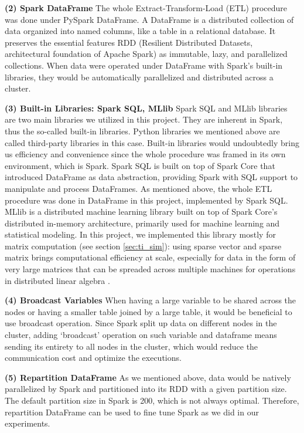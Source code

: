 \documentclass[12pt]{article}
\theoremstyle{definition}
\begin{document}
\textbf{(2) Spark DataFrame}
The whole Extract-Transform-Load (ETL) procedure was done under PySpark DataFrame. A DataFrame is a distributed collection of data organized into named columns, like a table in a relational database. It preserves the essential features RDD (Resilient Distributed Datasets, architectural foundation of Apache Spark) as immutable, lazy, and parallelized collections. When data were operated under DataFrame with Spark’s built-in libraries, they would be automatically parallelized and distributed across a cluster.


\textbf{(3) Built-in Libraries: Spark SQL, MLlib}
Spark SQL and MLlib libraries are two main libraries we utilized in this project. They are inherent in Spark, thus the so-called built-in libraries. Python libraries we mentioned above are called third-party libraries in this case. Built-in libraries would undoubtedly bring us efficiency and convenience since the whole procedure was framed in its own environment, which is Spark. Spark SQL is built on top of Spark Core that introduced DataFrame as data abstraction, providing Spark with SQL support to manipulate and process DataFrames. As mentioned above, the whole ETL procedure was done in DataFrame in this project, implemented by Spark SQL. MLlib is a distributed machine learning library built on top of Spark Core’s distributed in-memory architecture, primarily used for machine learning and statistical modeling. In this project, we implemented this library mostly for matrix computation (see section \ref{sec:ti_sim}): using sparse vector and sparse matrix brings computational efficiency at scale, especially for data in the form of very large matrices that can be spreaded across multiple machines for operations in distributed linear algebra \cite{matrix_spark_2016}.


\textbf{(4) Broadcast Variables}
When having a large variable to be shared across the nodes or having a smaller table joined by a large table, it would be beneficial to use broadcast operation. Since Spark split up data on different nodes in the cluster, adding ‘broadcast’ operation on such variable and dataframe means sending its entirety to all nodes in the cluster, which would reduce the communication cost and optimize the executions.


\textbf{(5) Repartition DataFrame}
As we mentioned above, data would be natively parallelized by Spark and partitioned into its RDD with a given partition size. The default partition size in Spark is 200, which is not always optimal. Therefore, repartition DataFrame can be used to fine tune Spark as we did in our experiments.
\end{document}
